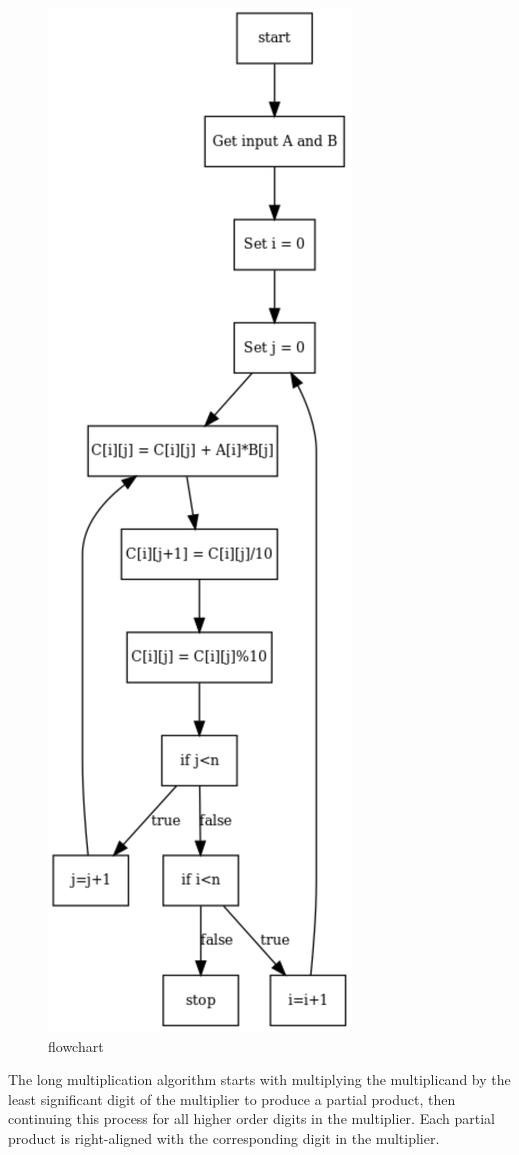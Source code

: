 \documentclass[a4paper,11pt,oneside]{article}
\begin{document}
\begin{figure}[!h]
\centerline{\includegraphics[scale=0.4]{flowchart}}
\caption{flowchart}
\end{figure}
The long multiplication algorithm starts with multiplying the multiplicand by the least 
significant digit of the multiplier to produce a partial product, then continuing this 
process for all higher order digits in the multiplier. Each partial product is right-aligned 
with the corresponding digit in the multiplier.
 
\end{document}
